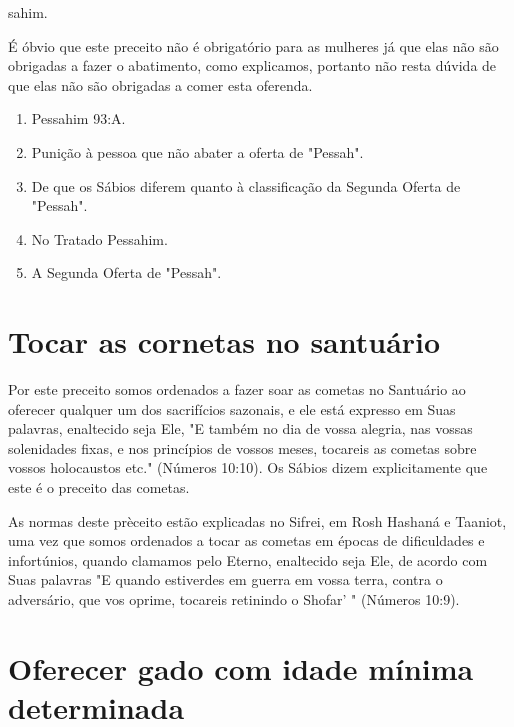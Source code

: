 \begin{itemize}
\begin{enumrate}
\begin{itemize}
\begin{itemize}
sahim.

É óbvio que este preceito não é obrigatório para as mulheres já que elas
não são obrigadas a fazer o abatimento, como explicamos, portanto não
resta dúvida de que elas não são obrigadas a comer esta oferenda.


\begin{enumerate}
\def\labelenumi{\arabic{enumi}.}
\setcounter{enumi}{77}
\item
 
 Pessahim 93:A.
 
\item
 
 Punição à pessoa que não abater a oferta de "Pessah".
 
\item
 
 De que os Sábios diferem quanto à classificação da Segunda Oferta de
 "Pessah".
 
\item
 
 No Tratado Pessahim.
 
\item
 
 A Segunda Oferta de "Pessah".
 
\end{enumerate}


\section{Tocar as cornetas no santuário}


Por este preceito somos ordenados a fazer soar as cometas no San­tuário
ao oferecer qualquer um dos sacrifícios sazonais, e ele está expresso em
Suas palavras, enaltecido seja Ele, "E também no dia de vossa alegria,
nas vos­sas solenidades fixas, e nos princípios de vossos meses,
tocareis as cometas so­bre vossos holocaustos etc." (Números 10:10). Os
Sábios dizem explicitamen­te que este é o preceito das cometas.

As normas deste prèceito estão explicadas no Sifrei, em Rosh Hashaná e
Taaniot, uma vez que somos ordenados a tocar as cometas em épocas de
difi­culdades e infortúnios, quando clamamos pelo Eterno, enaltecido
seja Ele, de acor­do com Suas palavras "E quando estiverdes em guerra em
vossa terra, contra o adversário, que vos oprime, tocareis retinindo o
Shofar' " (Números 10:9).

\section{Oferecer gado com idade mínima determinada}


\end{itemize}
\end{itemize}
\end{enumrate}
\end{itemize}
